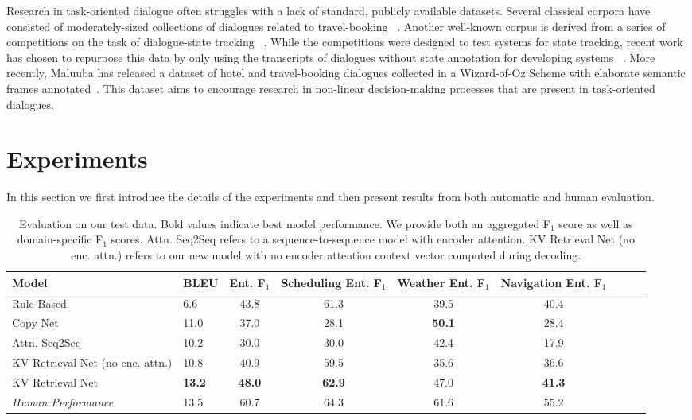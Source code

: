 \documentclass[11pt,a4paper]{article}
\begin{document}
  Research in task-oriented dialogue often struggles with a lack of standard, publicly available datasets. Several classical corpora have consisted of moderately-sized collections of dialogues related to travel-booking ~\cite{Hemphill:90,Bennett:02}. Another well-known corpus is derived from a series of competitions on the task of dialogue-state tracking ~\cite{Williams:13}. While the competitions were designed to test systems for state tracking, recent work has chosen to repurpose this data by only using the transcripts of dialogues without state annotation for developing systems ~\cite{Bordes:16,Williams:17}. More recently, Maluuba has released a dataset of hotel and travel-booking dialogues collected in a Wizard-of-Oz Scheme with elaborate semantic frames annotated~\cite{El-Asri:16}. This dataset aims to encourage research in non-linear decision-making processes that are present in task-oriented dialogues.


\section{Experiments}
In this section we first introduce the details of the experiments and then present results from both automatic and human evaluation.

\begin{table*}[ht]
\centering
\small
\begin{tabular}{@{}llccccccc@{}}
 {\bf Model} & {\bf BLEU} & {\bf Ent. F$_1$} & {\bf Scheduling Ent. F$_1$} & {\bf Weather Ent. F$_1$} & {\bf Navigation Ent. F$_1$} \\
\hline 
Rule-Based & 6.6 & 43.8  & 61.3 & 39.5 & 40.4\\
Copy Net &   11.0 & 37.0 & 28.1 & \textbf{50.1} & 28.4 \\
Attn. Seq2Seq & 10.2 & 30.0 & 30.0 & 42.4 & 17.9 \\
KV Retrieval Net (no enc. attn.) & 10.8 & 40.9 & 59.5 & 35.6 & 36.6 & \\
KV Retrieval Net & \textbf{13.2} & \textbf{48.0} & \textbf{62.9} & 47.0 & \textbf{41.3} \\
\hline
\emph{Human Performance} & 13.5 & 60.7 & 64.3 & 61.6 & 55.2 \\
\hline
\end{tabular}
\caption{Evaluation on our test data. Bold values indicate best model performance. We provide both an aggregated F$_1$ score as well as domain-specific F$_1$ scores. Attn. Seq2Seq refers to a sequence-to-sequence model with encoder attention. KV Retrieval Net (no enc. attn.) refers to our new model with no encoder attention context vector computed during decoding.}\label{tab:results}
\end{table*}
\end{document}
